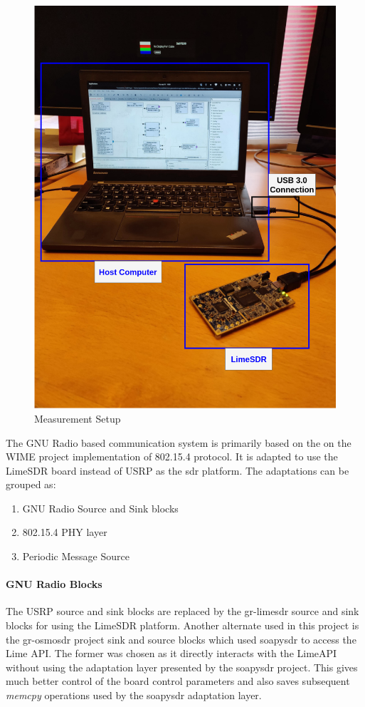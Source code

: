 \begin{figure}[h!]
\centering
\includegraphics[scale=0.2]{Thesis/Figure/MeasurementSetup.png}
\caption{Measurement Setup}
\label{Real_Setup}
\end{figure}

The GNU Radio based communication system is primarily based on the on the WIME project implementation of 802.15.4 protocol. It is adapted to use the LimeSDR board instead of USRP as the \ac{sdr} platform. The adaptations can be grouped as:

\begin{enumerate}
\item{GNU Radio Source and Sink blocks}
\item{802.15.4 \ac{PHY} layer}
\item{Periodic Message Source}
\end{enumerate}

\paragraph{GNU Radio Blocks}
The USRP source and sink blocks are replaced by the gr-limesdr source and sink blocks for using the LimeSDR platform.
Another alternate used in this project is the gr-osmosdr project sink and source blocks which used soapysdr to access the Lime API. The former was chosen as it directly interacts with the LimeAPI without using the adaptation layer presented by the soapysdr project. This gives much better control of the board control parameters and also saves subsequent \textit{memcpy} operations used by the soapysdr adaptation layer.\\

